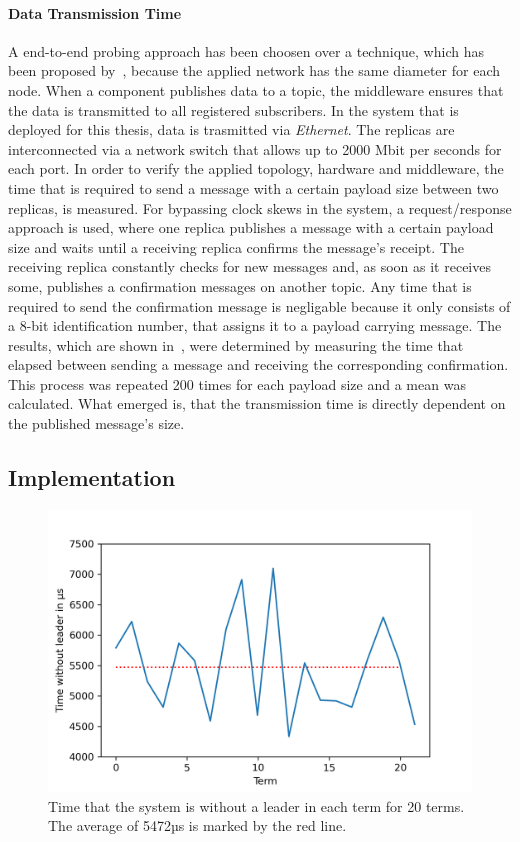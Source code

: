 \paragraph{Data Transmission Time}
A end-to-end probing approach has been choosen over a   technique, which has been proposed by~\cite{SinhaMeasureNetworkLatency}, because the applied network has the same diameter for each node.
When a component publishes data to a  topic, the middleware ensures that the data is transmitted to all registered subscribers.
In the system that is deployed for this thesis, data is trasmitted via \textit{Ethernet}.
The replicas are interconnected via a network switch that allows up to 2000 Mbit per seconds for each port.
In order to verify the applied topology, hardware and middleware, the time that is required to send a message with a certain payload size between two replicas, is measured.
For bypassing clock skews in the system, a request/response approach is used, where one replica publishes a message with a certain payload size and waits until a receiving replica confirms the message's receipt.
The receiving replica constantly checks for new messages and, as soon as it receives some, publishes a confirmation messages on another topic.
Any time that is required to send the confirmation message is negligable because it only consists of a 8-bit identification number, that assigns it to a payload carrying message.
The results, which are shown in~\cite{fig:PlotSendingTimes}, were determined by measuring the time that elapsed between sending a message and receiving the corresponding confirmation.
This process was repeated 200 times for each payload size and a mean was calculated.
What emerged is, that the transmission time is directly dependent on the published message's size.

\subsection{Implementation}
\begin{figure}[!hb]
	\centering
	\includegraphics[width=0.75\linewidth]{images/plots/timeWithoutLeader}
	\caption{Time that the system is without a leader in each term for 20 terms. The average of 5472µs is marked by the red line.}
	\label{fig:PlotTimeWithoutLeader}
\end{figure}

